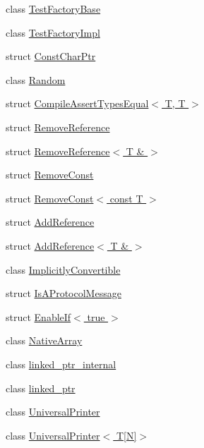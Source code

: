 \begin{DoxyCompactItemize}
class \hyperlink{classtesting_1_1internal_1_1TestFactoryBase}{\-Test\-Factory\-Base}
\item 
class \hyperlink{classtesting_1_1internal_1_1TestFactoryImpl}{\-Test\-Factory\-Impl}
\item 
struct \hyperlink{structtesting_1_1internal_1_1ConstCharPtr}{\-Const\-Char\-Ptr}
\item 
class \hyperlink{classtesting_1_1internal_1_1Random}{\-Random}
\item 
struct \hyperlink{structtesting_1_1internal_1_1CompileAssertTypesEqual_3_01T_00_01T_01_4}{\-Compile\-Assert\-Types\-Equal$<$ T, T $>$}
\item 
struct \hyperlink{structtesting_1_1internal_1_1RemoveReference}{\-Remove\-Reference}
\item 
struct \hyperlink{structtesting_1_1internal_1_1RemoveReference_3_01T_01_6_01_4}{\-Remove\-Reference$<$ T \& $>$}
\item 
struct \hyperlink{structtesting_1_1internal_1_1RemoveConst}{\-Remove\-Const}
\item 
struct \hyperlink{structtesting_1_1internal_1_1RemoveConst_3_01const_01T_01_4}{\-Remove\-Const$<$ const T $>$}
\item 
struct \hyperlink{structtesting_1_1internal_1_1AddReference}{\-Add\-Reference}
\item 
struct \hyperlink{structtesting_1_1internal_1_1AddReference_3_01T_01_6_01_4}{\-Add\-Reference$<$ T \& $>$}
\item 
class \hyperlink{classtesting_1_1internal_1_1ImplicitlyConvertible}{\-Implicitly\-Convertible}
\item 
struct \hyperlink{structtesting_1_1internal_1_1IsAProtocolMessage}{\-Is\-A\-Protocol\-Message}
\item 
struct \hyperlink{structtesting_1_1internal_1_1EnableIf_3_01true_01_4}{\-Enable\-If$<$ true $>$}
\item 
class \hyperlink{classtesting_1_1internal_1_1NativeArray}{\-Native\-Array}
\item 
class \hyperlink{classtesting_1_1internal_1_1linked__ptr__internal}{linked\-\_\-ptr\-\_\-internal}
\item 
class \hyperlink{classtesting_1_1internal_1_1linked__ptr}{linked\-\_\-ptr}
\item 
class \hyperlink{classtesting_1_1internal_1_1UniversalPrinter}{\-Universal\-Printer}
\item 
class \hyperlink{classtesting_1_1internal_1_1UniversalPrinter_3_01T[N]_4}{\-Universal\-Printer$<$ T\mbox{[}\-N\mbox{]}$>$}

\end{DoxyCompactItemize}
